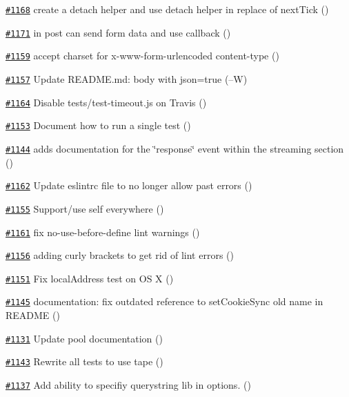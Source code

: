 \begin{DoxyItemize}
\item \href{https://github.com/request/request/pull/1168}{\tt \#1168} create a detach helper and use detach helper in replace of next\+Tick ()
\item \href{https://github.com/request/request/pull/1171}{\tt \#1171} in post can send form data and use callback ()
\item \href{https://github.com/request/request/pull/1159}{\tt \#1159} accept charset for x-\/www-\/form-\/urlencoded content-\/type ()
\item \href{https://github.com/request/request/pull/1157}{\tt \#1157} Update R\+E\+A\+D\+M\+E.\+md\+: body with json=true (--W)
\item \href{https://github.com/request/request/pull/1164}{\tt \#1164} Disable tests/test-\/timeout.\+js on Travis ()
\item \href{https://github.com/request/request/pull/1153}{\tt \#1153} Document how to run a single test ()
\item \href{https://github.com/request/request/pull/1144}{\tt \#1144} adds documentation for the \char`\"{}response\char`\"{} event within the streaming section ()
\item \href{https://github.com/request/request/pull/1162}{\tt \#1162} Update eslintrc file to no longer allow past errors ()
\item \href{https://github.com/request/request/pull/1155}{\tt \#1155} Support/use self everywhere ()
\item \href{https://github.com/request/request/pull/1161}{\tt \#1161} fix no-\/use-\/before-\/define lint warnings ()
\item \href{https://github.com/request/request/pull/1156}{\tt \#1156} adding curly brackets to get rid of lint errors ()
\item \href{https://github.com/request/request/pull/1151}{\tt \#1151} Fix local\+Address test on OS X ()
\item \href{https://github.com/request/request/pull/1145}{\tt \#1145} documentation\+: fix outdated reference to set\+Cookie\+Sync old name in R\+E\+A\+D\+ME ()
\item \href{https://github.com/request/request/pull/1131}{\tt \#1131} Update pool documentation ()
\item \href{https://github.com/request/request/pull/1143}{\tt \#1143} Rewrite all tests to use tape ()
\item \href{https://github.com/request/request/pull/1137}{\tt \#1137} Add ability to specifiy querystring lib in options. ()

\end{DoxyItemize}
